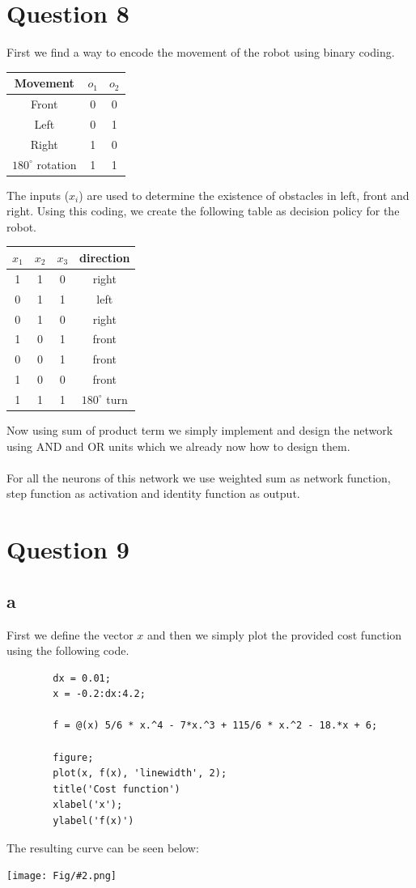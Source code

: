 \documentclass[]{article}
\newcommand{\pict}[2]{\begin{center}
		\texttt{[image: Fig/\#2.png]}
\end{center}}
\begin{document}
	\section{Question 8}
	First we find a way to encode the movement of the robot using binary coding.
	\begin{center}
		\begin{tabular}{|c|c|c|}
			\hline
			Movement & $o_1$ & $o_2$ \\ \hline
			Front & 0 & 0\\
			Left & 0 & 1 \\
			Right & 1 & 0\\
			$180^\circ$ rotation & 1 & 1\\
			\hline
		\end{tabular}
	\end{center}
	The inputs ($x_i$) are used to determine the existence of obstacles in left, front and right. Using this coding, we create the following table as decision policy for the robot.
	\begin{center}
		\begin{tabular}{|c|c|c||c|}
			\hline
			$x_1$ & $x_2$ & $x_3$ & direction \\ \hline
			1 & 1 & 0 & right\\
			0 & 1 & 1 & left \\
			0 & 1 & 0 & right\\
			1 & 0 & 1 & front\\
			0 & 0 & 1 & front \\
			1 & 0 & 0 & front \\
			1 & 1 & 1 & $180^\circ$ turn \\
			\hline
		\end{tabular}
	\end{center}
	Now using sum of product term we simply implement and design the network using AND and OR units which we already now how to design them.\\\\
	For all the neurons of this network we use weighted sum as network function, step function as activation and identity function as output.
	\section{Question 9}
	\subsection*{a}
	First we define the vector $x$ and then we simply plot the provided cost function using the following code.
	\begin{lstlisting}
		dx = 0.01;
		x = -0.2:dx:4.2;
		
		f = @(x) 5/6 * x.^4 - 7*x.^3 + 115/6 * x.^2 - 18.*x + 6;
		
		figure;
		plot(x, f(x), 'linewidth', 2);
		title('Cost function')
		xlabel('x');
		ylabel('f(x)')
	\end{lstlisting}
	The resulting curve can be seen below:
	\pict{0.45}{F5}
	
\end{document}
